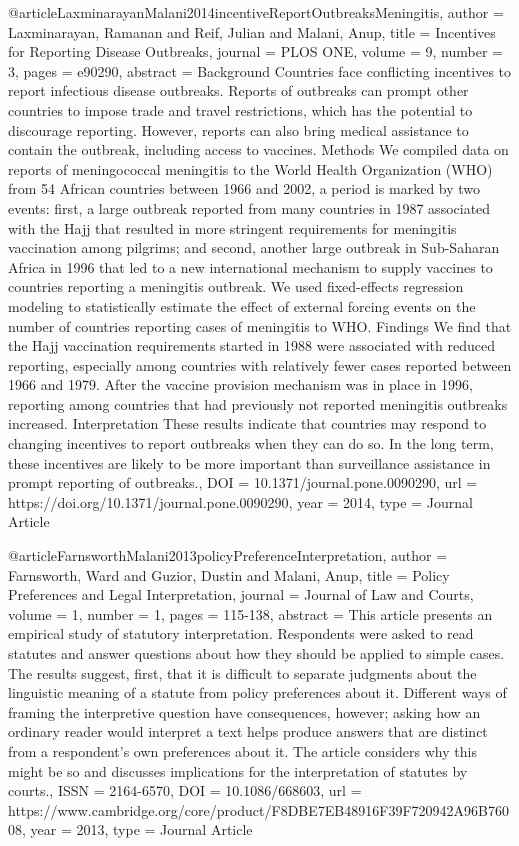 @article{LaxminarayanMalani2014incentiveReportOutbreaksMeningitis,
   author = {Laxminarayan, Ramanan and Reif, Julian and Malani, Anup},
   title = {Incentives for Reporting Disease Outbreaks},
   journal = {PLOS ONE},
   volume = {9},
   number = {3},
   pages = {e90290},
   abstract = {Background Countries face conflicting incentives to report infectious disease outbreaks. Reports of outbreaks can prompt other countries to impose trade and travel restrictions, which has the potential to discourage reporting. However, reports can also bring medical assistance to contain the outbreak, including access to vaccines. Methods We compiled data on reports of meningococcal meningitis to the World Health Organization (WHO) from 54 African countries between 1966 and 2002, a period is marked by two events: first, a large outbreak reported from many countries in 1987 associated with the Hajj that resulted in more stringent requirements for meningitis vaccination among pilgrims; and second, another large outbreak in Sub-Saharan Africa in 1996 that led to a new international mechanism to supply vaccines to countries reporting a meningitis outbreak. We used fixed-effects regression modeling to statistically estimate the effect of external forcing events on the number of countries reporting cases of meningitis to WHO. Findings We find that the Hajj vaccination requirements started in 1988 were associated with reduced reporting, especially among countries with relatively fewer cases reported between 1966 and 1979. After the vaccine provision mechanism was in place in 1996, reporting among countries that had previously not reported meningitis outbreaks increased. Interpretation These results indicate that countries may respond to changing incentives to report outbreaks when they can do so. In the long term, these incentives are likely to be more important than surveillance assistance in prompt reporting of outbreaks.},
   DOI = {10.1371/journal.pone.0090290},
   url = {https://doi.org/10.1371/journal.pone.0090290},
   year = {2014},
   type = {Journal Article}
}


@article{FarnsworthMalani2013policyPreferenceInterpretation,
   author = {Farnsworth, Ward and Guzior, Dustin and Malani, Anup},
   title = {Policy Preferences and Legal Interpretation},
   journal = {Journal of Law and Courts},
   volume = {1},
   number = {1},
   pages = {115-138},
   abstract = {This article presents an empirical study of statutory interpretation. Respondents were asked to read statutes and answer questions about how they should be applied to simple cases. The results suggest, first, that it is difficult to separate judgments about the linguistic meaning of a statute from policy preferences about it. Different ways of framing the interpretive question have consequences, however; asking how an ordinary reader would interpret a text helps produce answers that are distinct from a respondent’s own preferences about it. The article considers why this might be so and discusses implications for the interpretation of statutes by courts.},
   ISSN = {2164-6570},
   DOI = {10.1086/668603},
   url = {https://www.cambridge.org/core/product/F8DBE7EB48916F39F720942A96B76008},
   year = {2013},
   type = {Journal Article}
}

